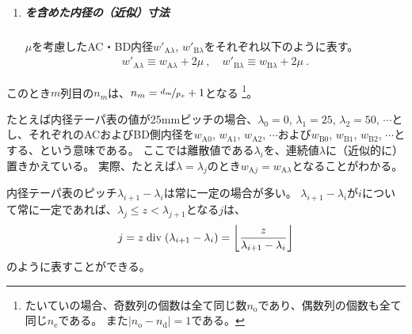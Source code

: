 \begin{tcolorbox}[title={\Dimple に関する表記法}, fonttitle=\gtfamily\bfseries, breakable, enhanced jigsaw]
\begin{enumerate}[label=\sarrow]
\item
\subparagraph*{\PlatingThk を含めた内径の（近似）寸法}
\PlatingThk$\mu$を考慮したAC・BD内径$w'_{\mathrm A\lambda}$, $w'_{\mathrm B\lambda}$をそれぞれ以下のように表す。
\begin{align*}
  w'_{\mathrm A\lambda} \equiv w_{\mathrm A\lambda}+2\mu~, \quad
  w'_{\mathrm B\lambda} \equiv w_{\mathrm B\lambda}+2\mu~.
\end{align*}
\end{enumerate}
\end{tcolorbox}\noindent
このとき$m$列目の\DimpleNum$n_m$は、$n_m = \nicefrac{d_m}{p_x}+1$となる
\footnote{\label{fn:generallyDimpleN}%
たいていの場合、奇数列の個数は全て同じ数$n_\mathrm o$であり、偶数列の個数も全て同じ$n_\mathrm e$である。
また$|n_\mathrm o-n_\mathrm d| = 1$である。}。
\begin{hosoku}[label=hosoku:example4taper]
たとえば内径テーパ表の値が25mmピッチの場合、$\lambda_0=0$, $\lambda_1=25$, $\lambda_2=50$, $\cdots$とし、それぞれのACおよびBD側内径を$w_{\mathrm A0}$, $w_{\mathrm A1}$, $w_{\mathrm A2}$, $\cdots$および$w_{\mathrm B0}$, $w_{\mathrm B1}$, $w_{\mathrm B2}$, $\cdots$とする、という意味である。
ここでは離散値である$\lambda_i$を、連続値$\lambda$に（近似的に）置きかえている。
実際、たとえば$\lambda = \lambda_j$のとき$w_{\mathrm Aj} = w_{\mathrm A\lambda}$となることがわかる。
\end{hosoku}\relax
\begin{hosoku}
内径テーパ表のピッチ$\lambda_{i+1}-\lambda_i$は常に一定の場合が多い。
$\lambda_{i+1}-\lambda_i$が$i$について常に一定であれば、$\lambda_j \leq z < \lambda_{j+1}$となる$j$は、
\begin{align*}
  j = z \bDiv (\lambda_{i+1}-\lambda_i) = \left\lfloor\frac z{\lambda_{i+1}-\lambda_i}\right\rfloor
\end{align*}
のように表すことができる。
\end{hosoku}
